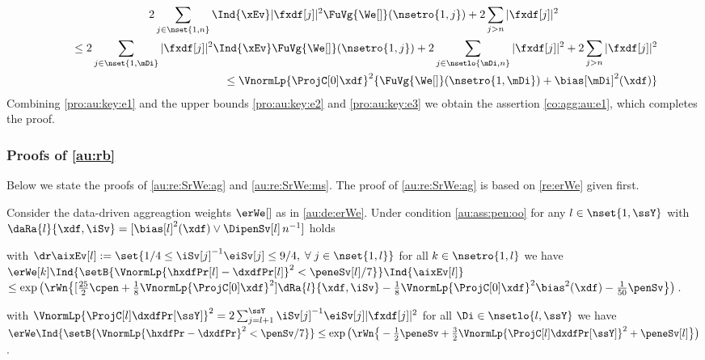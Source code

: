 \begin{pro}
\begin{multline}
2\sum_{j\in\nset{1,n}}\Ind{\xEv}|\fxdf[j]|^2\FuVg{\We[]}(\nsetro{1,j})+2\sum_{j>n}|\fxdf[j]|^2\\
\hspace*{5ex}\leq  2\sum_{j\in\nset{1,\mDi}}|\fxdf[j]|^2\Ind{\xEv}\FuVg{\We[]}(\nsetro{1,j})+ 2\sum_{j\in\nsetlo{\mDi,n}}|\fxdf[j]|^2+
  2\sum_{j>n}|\fxdf[j]|^2\\\hfill
\leq \VnormLp{\ProjC[0]\xdf}^2\{\FuVg{\We[]}(\nsetro{1,\mDi})+\bias[\mDi]^2(\xdf)\}
\end{multline}
Combining  \eqref{pro:au:key:e1} and the upper bounds \eqref{pro:au:key:e2}
and \eqref{pro:au:key:e3} we obtain   the assertion \eqref{co:agg:au:e1}, which completes the proof.\proEnd
\end{pro}
\subsubsection{Proofs of \cref{au:rb}}\label{a:au:rb}
\begin{te}
 Below  we state the proofs of  \cref{au:re:SrWe:ag} and \cref{au:re:SrWe:ms}. The
  proof of \cref{au:re:SrWe:ag} is based on \cref{re:erWe} given first.
\end{te}
\begin{lm}\label{re:erWe} Consider the data-driven aggreagtion weights
  $\erWe[]$ as in \eqref{au:de:erWe}. Under condition
  \ref{au:ass:pen:oo} for any $l\in\nset{1,\ssY}$ with
  $\daRa{l}{\xdf,\iSv}=[\bias[l]^2(\xdf)\vee \DipenSv[l]\, n^{-1}]$ holds
  \begin{resListeN}[]
  \item\label{re:erWe:i} with
    $\dr\aixEv[l]:=\set{1/4\leq\iSv[j]^{-1}\eiSv[j]\leq9/4,\;\forall\;j\in\nset{1,l}}$ for all $k\in\nsetro{1,l}$ 
    we have\\
   $\erWe[k]\Ind{\setB{\VnormLp{\hxdfPr[l]-\dxdfPr[l]}^2<\peneSv[l]/7}}\Ind{\aixEv[l]}$\\\null\hfill$\leq
  \exp\big(\rWn\big\{[\tfrac{25}{2}\cpen+\tfrac{1}{8}\VnormLp{\ProjC[0]\xdf}^2]\dRa{l}{\xdf,\iSv}-\tfrac{1}{8}\VnormLp{\ProjC[0]\xdf}^2\bias^2(\xdf)-\tfrac{1}{50}\penSv\big\}\big)$.
  \item\label{re:erWe:ii} with $\VnormLp{\ProjC[l]\dxdfPr[\ssY]}^2=2\sum_{j=l+1}^{\ssY}\iSv[j]^{-1}\eiSv[j]|\fxdf[j]|^2$
    for all $\Di\in\nsetlo{l,\ssY}$ we have\\
    $\erWe\Ind{\setB{\VnormLp{\hxdfPr-\dxdfPr}^2<\penSv/7}} \leq
   \exp\big(\rWn\big\{-\tfrac{1}{2}\peneSv+\tfrac{3}{2}\VnormLp{\ProjC[l]\dxdfPr[\ssY]}^2+\peneSv[l]\big\}\big)$.
  \end{resListeN}
\end{lm}
